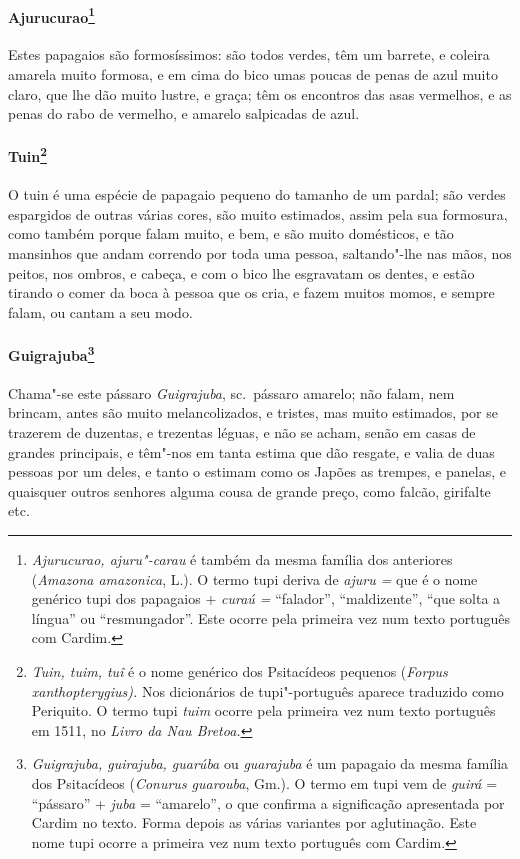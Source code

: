 \paragraph{Ajurucurao\footnote{ \textit{Ajurucurao, ajuru"-carau} é
também da mesma família dos anteriores (\textit{Amazona amazonica}, L.). 
O termo tupi deriva de \textit{ajuru =} que é o nome genérico
tupi dos papagaios + \textit{curaú =} ``falador'', ``maldizente'', ``que
solta a língua'' ou ``resmungador''. Este ocorre pela primeira vez num
texto português com Cardim.}} Estes papagaios são formosíssimos: 
são todos verdes, têm um barrete, e coleira amarela
muito formosa, e em cima do bico umas poucas de penas de azul muito
claro, que lhe dão muito lustre, e graça; têm os encontros das asas
vermelhos, e as penas do rabo de vermelho, e amarelo salpicadas de azul.

\paragraph{Tuin\footnote{ \textit{Tuin, tuim, tuî} é o nome genérico
dos Psitacídeos pequenos (\textit{Forpus xanthopterygius).} Nos
dicionários de tupi"-português aparece traduzido como Periquito. O termo
tupi \textit{tuim} ocorre pela primeira vez num texto português em
1511, no \textit{Livro da Nau Bretoa.}}} O tuin é uma espécie
de papagaio pequeno do tamanho de um pardal; são verdes espargidos de
outras várias cores, são muito estimados, assim pela sua formosura,
como também porque falam muito, e bem, e são muito domésticos, e tão
mansinhos que andam correndo por toda uma pessoa, saltando"-lhe nas
mãos, nos peitos, nos ombros, e cabeça, e com o bico lhe esgravatam os
dentes, e estão tirando o comer da boca à pessoa que os cria, e fazem
muitos momos, e sempre falam, ou cantam a seu modo.

\paragraph{Guigrajuba\footnote{ \textit{Guigrajuba, guirajuba,
guarúba} ou \textit{guarajuba} é um papagaio da mesma
família dos Psitacídeos (\textit{Conurus guarouba}, Gm.). O termo em
tupi vem de \textit{guirá} = ``pássaro'' + \textit{juba} = ``amarelo'', o
que confirma a significação apresentada por Cardim no texto. Forma
depois as várias variantes por aglutinação. Este nome tupi ocorre a
primeira vez num texto português com Cardim.}} Chama"-se este
pássaro \textit{Guigrajuba}, sc.~pássaro amarelo; não falam, nem
brincam, antes são muito melancolizados, e tristes, mas muito
estimados, por se trazerem de duzentas, e trezentas léguas, e não se
acham, senão em casas de grandes principais, e têm"-nos em tanta estima
que dão resgate, e valia de duas pessoas por um deles, e tanto o
estimam como os Japões as trempes, e panelas, e quaisquer outros
senhores alguma cousa de grande preço, como falcão, girifalte etc.

